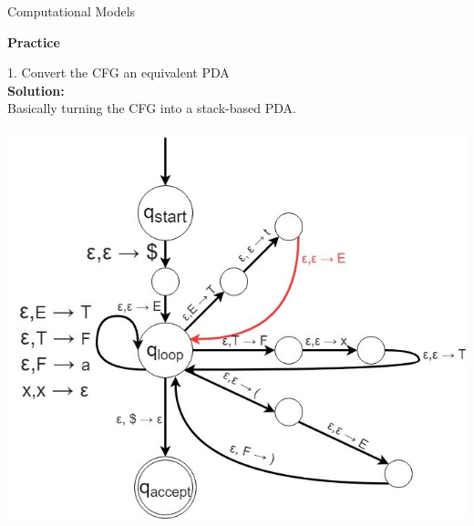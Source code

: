 \documentclass[12pt]{article}
\begin{document}
\vspace*{-0.3in}

\hfill
Computational Models

\begin{center}

\textbf{\large Practice}

\end{center}


1. Convert the CFG an equivalent PDA \\
\textbf{Solution:} \\
Basically turning the CFG into a stack-based PDA. \\
\vspace*{0.3in}
\centerline{ \includegraphics[scale=.85]{2.11.JPG}}
\end{document}
